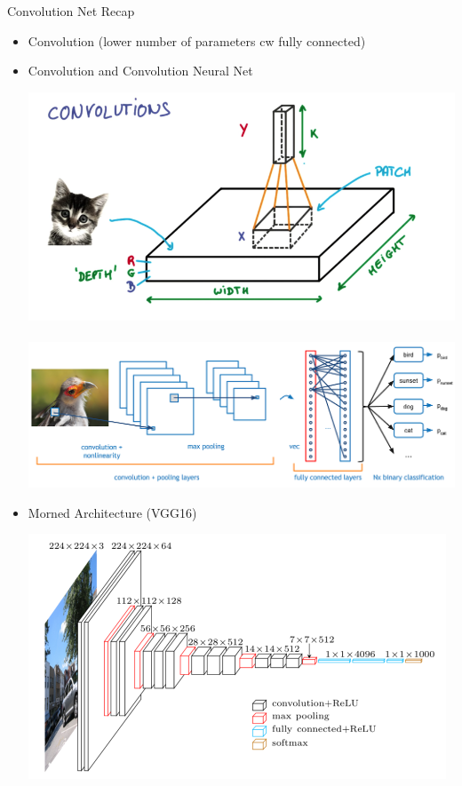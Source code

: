 \documentclass{beamer}
\begin{document}
\begin{frame}{Convolution Net Recap}
	\begin{itemize}
		\item Convolution (lower number of parameters cw fully connected)  
		\item Convolution and Convolution Neural Net
				\begin{center}
					\includegraphics[scale=0.13]{img/cnn2}~~
					\includegraphics[scale=0.31]{img/cnn5}
				\end{center}
		
		\item Morned Architecture (VGG16)
				\begin{center}
					\includegraphics[scale=0.4]{img/cnn3}
				\end{center}
	\end{itemize}
\end{frame}
\end{document}
